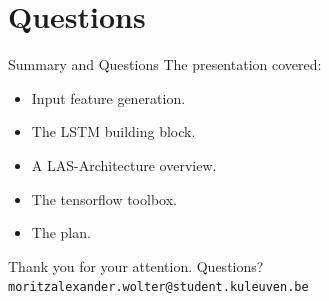 \documentclass{beamer}
\begin{document}
\section{Questions}
\begin{frame}{Summary and Questions}
	The presentation covered:
	\begin{itemize}
		\item Input feature generation.
		\item The LSTM building block.
		\item A LAS-Architecture overview.
		\item The tensorflow toolbox.
		\item The plan.
	\end{itemize}
	Thank you for your attention. Questions? \\
	\texttt{moritzalexander.wolter@student.kuleuven.be}
\end{frame}
\end{document}
